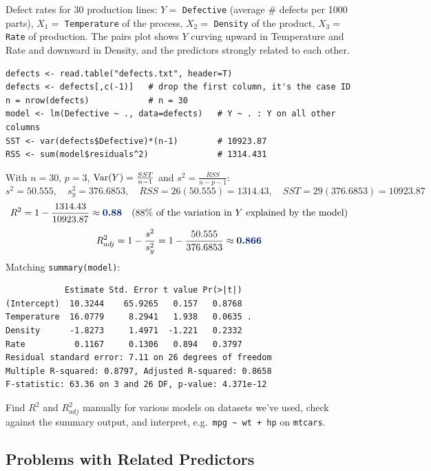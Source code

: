 \begin{example}
    Defect rates for 30 production lines: $Y=$ \texttt{Defective} (average \# defects per 1000
    parts), $X_1=$ \texttt{Temperature} of the process, $X_2=$ \texttt{Density} of the product,
    $X_3=$ \texttt{Rate} of production. The pairs plot shows $Y$ curving upward in Temperature and
    Rate and downward in Density, and the predictors strongly related to each other.
\begin{verbatim}
defects <- read.table("defects.txt", header=T)
defects <- defects[,c(-1)]   # drop the first column, it's the case ID
n = nrow(defects)            # n = 30
model <- lm(Defective ~ ., data=defects)   # Y ~ . : Y on all other columns
SST <- var(defects$Defective)*(n-1)        # 10923.87
RSS <- sum(model$residuals^2)              # 1314.431
\end{verbatim}
    With $n=30$, $p=3$, $\operatorname{Var}(Y)=\frac{SST}{n-1}$ and $s^2=\frac{RSS}{n-p-1}$:
    \[s^2=50.555,\quad s_y^2=376.6853,\quad RSS=26(50.555)=1314.43,\quad SST=29(376.6853)=10923.87\]
    \[R^2=1-\frac{1314.43}{10923.87}\approx\dbb{0.88}\quad\text{(88\% of the variation in $Y$ explained by the model)}\]
    \[R^2_{adj}=1-\frac{s^2}{s_y^2}=1-\frac{50.555}{376.6853}\approx\dbb{0.866}\]
    Matching \texttt{summary(model)}:
\begin{verbatim}
            Estimate Std. Error t value Pr(>|t|)
(Intercept)  10.3244    65.9265   0.157   0.8768
Temperature  16.0779     8.2941   1.938   0.0635 .
Density      -1.8273     1.4971  -1.221   0.2332
Rate          0.1167     0.1306   0.894   0.3797
Residual standard error: 7.11 on 26 degrees of freedom
Multiple R-squared: 0.8797, Adjusted R-squared: 0.8658
F-statistic: 63.36 on 3 and 26 DF, p-value: 4.371e-12
\end{verbatim}
\end{example}

\begin{exercise}
    Find $R^2$ and $R^2_{adj}$ manually for various models on datasets we've used, check against
    the summary output, and interpret, e.g.\ \texttt{mpg \textasciitilde{} wt + hp} on \texttt{mtcars}.
\end{exercise}

\subsection{Problems with Related Predictors}

